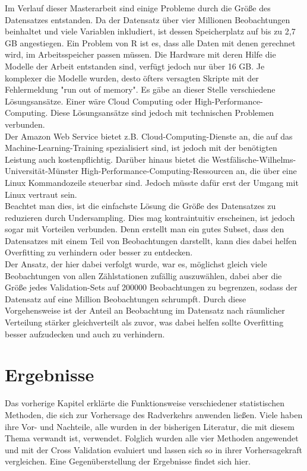 \documentclass[a4paper,12pt]{thesis}
\begin{document}
Im Verlauf dieser Masterarbeit sind einige Probleme durch die Größe des Datensatzes entstanden. Da der Datensatz über vier Millionen Beobachtungen beinhaltet und viele Variablen inkludiert, ist dessen Speicherplatz auf bis zu 2,7 GB angestiegen. Ein Problem von R ist es, dass alle Daten mit denen gerechnet wird, im Arbeitsspeicher passen müssen. Die Hardware mit deren Hilfe die Modelle der Arbeit entstanden sind, verfügt jedoch nur über 16 GB. Je komplexer die Modelle wurden, desto öfters versagten Skripte mit der Fehlermeldung "run out of memory". Es gäbe an dieser Stelle verschiedene Lösungsansätze. Einer wäre Cloud Computing oder High-Performance-Computing. Diese Lösungsansätze sind jedoch mit technischen Problemen verbunden.\\ 
Der Amazon Web Service bietet z.B. Cloud-Computing-Dienste an, die auf das Machine-Learning-Training spezialisiert sind, ist jedoch mit der benötigten Leistung auch kostenpflichtig. Darüber hinaus bietet die Westfälische-Wilhelms-Universität-Münster High-Performance-Computing-Ressourcen an, die über eine Linux Kommandozeile steuerbar sind. Jedoch müsste dafür erst der Umgang mit Linux vertraut sein.\\
Beachtet man dies, ist die einfachste Lösung die Größe des Datensatzes zu reduzieren durch Undersampling. Dies mag kontraintuitiv erscheinen, ist jedoch sogar mit Vorteilen verbunden. Denn erstellt man ein gutes Subset, dass den Datensatzes mit einem Teil von Beobachtungen darstellt, kann dies dabei helfen Overfitting zu verhindern oder besser zu entdecken.\\
Der Ansatz, der hier dabei verfolgt wurde, war es, möglichst gleich viele Beobachtungen von allen Zählstationen zufällig auszuwählen, dabei aber die Größe jedes Validation-Sets auf 200000 Beobachtungen zu begrenzen, sodass der Datensatz auf eine Million Beobachtungen schrumpft. Durch diese Vorgehensweise ist der Anteil an Beobachtung im Datensatz nach räumlicher Verteilung stärker gleichverteilt als zuvor, was dabei helfen sollte Overfitting besser aufzudecken und auch zu verhindern.

\chapter{Ergebnisse}

Das vorherige Kapitel erklärte die Funktionsweise verschiedener statistischen Methoden, die sich zur Vorhersage des Radverkehrs anwenden ließen. Viele haben ihre Vor- und Nachteile, alle wurden in der bisherigen Literatur, die mit diesem Thema verwandt ist, verwendet. Folglich wurden alle vier Methoden angewendet und mit der Cross Validation evaluiert und lassen sich so in ihrer Vorhersagekraft vergleichen. Eine Gegenüberstellung der Ergebnisse findet sich hier.
\end{document}
